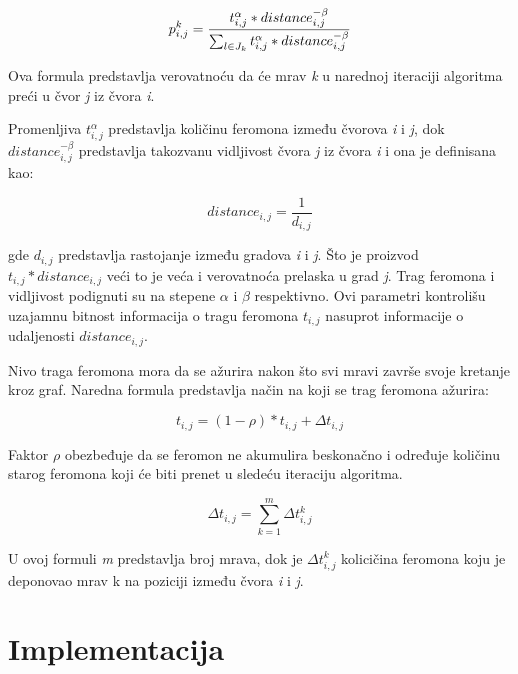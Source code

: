 \documentclass[a4paper]{article}
\begin{document}
\begin{equation}\label{1}
p_{i,j}^k = {t_{i,j}^\alpha * distance_{i,j}^{-\beta} \over \sum_{l \in J_k}^{} t_{i,j}^\alpha * distance_{i,j}^{-\beta}}
\end{equation}

\hfill \break

Ova formula predstavlja verovatnoću da će mrav \textit{k} u narednoj iteraciji algoritma preći u čvor \textit{j} iz čvora \textit{i}.


Promenljiva $t_{i,j}^\alpha$ predstavlja količinu feromona između čvorova \textit{i} i \textit{j}, dok $distance_{i,j}^{-\beta}$ predstavlja takozvanu vidljivost čvora \textit{j}  iz čvora \textit{i} i ona je definisana kao:

\begin{equation}\label{2}
distance_{i,j} = \frac{1}{d_{i,j}}
\end{equation}

\hfill \break

gde $d_{i,j}$ predstavlja rastojanje između gradova \textit{i} i \textit{j}. Što je proizvod $t_{i,j} * distance_{i,j}$ veći to je veća i verovatnoća prelaska u grad \textit{j}. Trag feromona i vidljivost podignuti su na stepene $\alpha$ i $\beta$ respektivno. Ovi parametri kontrolišu uzajamnu bitnost informacija o tragu feromona $t_{i,j}$ nasuprot informacije o udaljenosti $distance_{i,j}$.

Nivo traga feromona mora da se ažurira nakon što svi mravi završe svoje kretanje kroz graf. Naredna formula predstavlja način na koji se trag feromona ažurira:

\begin{equation}\label{3}
t_{i,j} = (1-\rho) * t_{i,j} + \Delta t_{i,j}
\end{equation}

Faktor $\rho$ obezbeđuje da se feromon ne akumulira beskonačno i određuje količinu starog feromona koji će biti prenet u sledeću iteraciju algoritma.

\begin{equation}\label{4}
\Delta t_{i,j}  = \sum_{k=1}^{m} \Delta t^k_{i,j}
\end{equation}

U ovoj formuli \textit{m} predstavlja broj mrava, dok je $\Delta t^k_{i,j}$ kolicičina feromona koju je deponovao mrav k na poziciji između čvora \textit{i} i \textit{j}.

\section{Implementacija}
\label{sec:naslov1}
\end{document}
